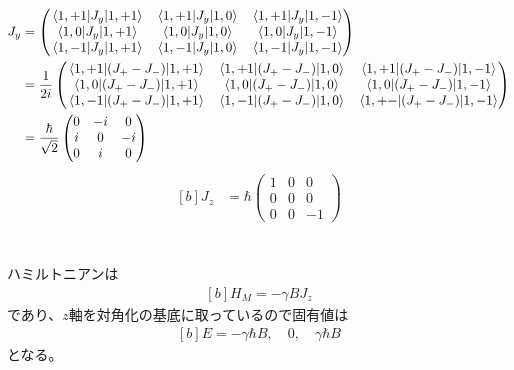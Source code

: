 \documentclass[../ap_2012.tex]{subfiles}
\begin{document}
\begin{equation}\begin{aligned}[b]
    J_y &= \begin{pmatrix}
        \mel{1,+1}{J_y}{1,+1} & \mel{1,+1}{J_y}{1,0} & \mel{1,+1}{J_y}{1,-1}\\
        \mel{1,0}{J_y}{1,+1} & \mel{1,0}{J_y}{1,0} & \mel{1,0}{J_y}{1,-1}\\
        \mel{1,-1}{J_y}{1,+1} & \mel{1,-1}{J_y}{1,0} & \mel{1,-1}{J_y}{1,-1}
    \end{pmatrix}\\
    &= \frac{1}{2i}\begin{pmatrix}
        \mel{1,+1}{(J_+-J_-)}{1,+1} & \mel{1,+1}{(J_+-J_-)}{1,0} & \mel{1,+1}{(J_+-J_-)}{1,-1}\\
        \mel{1,0}{(J_+-J_-)}{1,+1} & \mel{1,0}{(J_+-J_-)}{1,0} & \mel{1,0}{(J_+-J_-)}{1,-1}\\
        \mel{1,-1}{(J_+-J_-)}{1,+1} & \mel{1,-1}{(J_+-J_-)}{1,0} & \mel{1,+-}{(J_+-J_-)}{1,-1}
    \end{pmatrix}\\
    &= \frac{\hbar}{\sqrt{2}}\begin{pmatrix}
        0 & -i & 0\\
        i & 0 & -i\\
        0 & i & 0
    \end{pmatrix}
\end{aligned}\end{equation}
\begin{equation}\begin{aligned}[b]
    J_z &= \hbar\begin{pmatrix}
        1 & 0 & 0\\
        0 & 0 & 0\\
        0 & 0 & -1
    \end{pmatrix}
\end{aligned}\end{equation}

\section{}
ハミルトニアンは
\begin{equation}\begin{aligned}[b]
    H_M = -\gamma B J_z
\end{aligned}\end{equation}
であり、\(z\)軸を対角化の基底に取っているので固有値は
\begin{equation}\begin{aligned}[b]
    E= -\gamma \hbar B,\quad 0,\quad\gamma\hbar B
\end{aligned}\end{equation}
となる。
\end{document}
